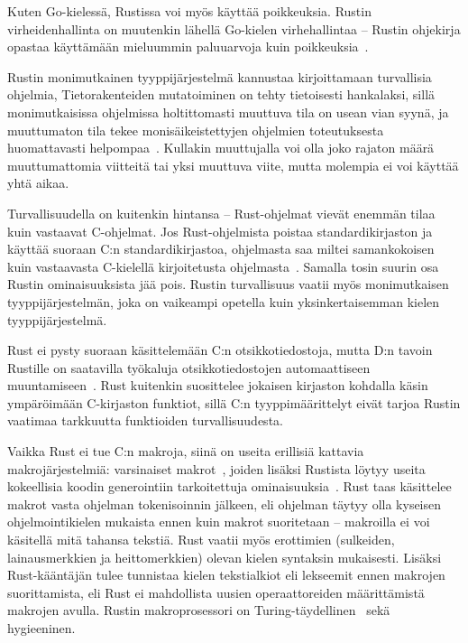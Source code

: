 Kuten Go-kielessä, Rustissa voi myös käyttää poikkeuksia. Rustin
virheidenhallinta on muutenkin lähellä Go-kielen virhehallintaa -- Rustin
ohjekirja opastaa käyttämään mieluummin paluuarvoja kuin
poikkeuksia~\citep{rusterrorhandling}.

Rustin monimutkainen tyyppijärjestelmä kannustaa kirjoittamaan turvallisia
ohjelmia, Tietorakenteiden mutatoiminen on tehty tietoisesti hankalaksi, sillä
monimutkaisissa ohjelmissa holtittomasti muuttuva tila on usean vian syynä, ja
muuttumaton tila tekee monisäikeistettyjen ohjelmien
toteutuksesta huomattavasti helpompaa~\citep[luku 4, kohta 17]{effectivejava}.
Kullakin muuttujalla voi olla joko rajaton määrä muuttumattomia
viitteitä tai yksi muuttuva viite, mutta molempia ei voi käyttää yhtä aikaa.

Turvallisuudella on kuitenkin hintansa -- Rust-ohjelmat vievät enemmän tilaa
kuin vastaavat C-ohjelmat. Jos Rust-ohjelmista poistaa standardikirjaston ja
käyttää suoraan C:n standardikirjastoa, ohjelmasta saa miltei samankokoisen
kuin vastaavasta C-kielellä kirjoitetusta ohjelmasta~\citep{rustbinarysize}.
Samalla tosin suurin osa Rustin ominaisuuksista jää pois. Rustin turvallisuus
vaatii myös monimutkaisen tyyppijärjestelmän, joka on vaikeampi opetella kuin
yksinkertaisemman kielen tyyppijärjestelmä.

Rust ei pysty suoraan käsittelemään C:n otsikkotiedostoja, mutta D:n tavoin
Rustille on saatavilla työkaluja otsikkotiedostojen automaattiseen
muuntamiseen~\citep{rustbindgen}. Rust kuitenkin suosittelee jokaisen kirjaston
kohdalla käsin ympäröimään C-kirjaston funktiot, sillä C:n tyyppimäärittelyt
eivät tarjoa Rustin vaatimaa tarkkuutta funktioiden turvallisuudesta.

Vaikka Rust ei tue C:n makroja, siinä on useita erillisiä kattavia
makrojärjestelmiä: varsinaiset makrot~\citep{rustmacros}, joiden lisäksi
Rustista löytyy useita kokeellisia koodin generointiin tarkoitettuja
ominaisuuksia~\citep{rustprocmacros, rustplugins}. Rust taas käsittelee makrot
vasta ohjelman tokenisoinnin jälkeen, eli ohjelman täytyy olla kyseisen
ohjelmointikielen mukaista ennen kuin makrot suoritetaan -- makroilla ei voi
käsitellä mitä tahansa tekstiä. Rust vaatii myös erottimien (sulkeiden,
lainausmerkkien ja heittomerkkien) olevan kielen syntaksin mukaisesti. Lisäksi
Rust-kääntäjän tulee tunnistaa kielen tekstialkiot eli
lekseemit ennen makrojen suorittamista, eli Rust ei mahdollista
uusien operaattoreiden määrittämistä makrojen avulla. Rustin makroprosessori on
Turing-täydellinen~\citep{rustmacros} sekä hygieeninen.

